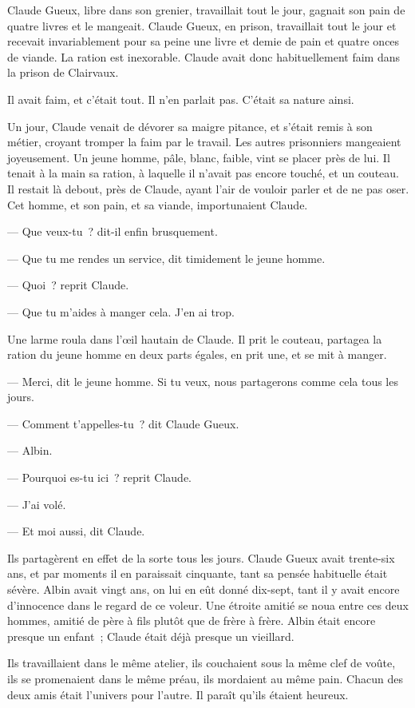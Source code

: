 \documentclass[french,twoside]{book} %
\begin{document}
Claude Gueux, libre dans son grenier, travaillait tout le jour, gagnait son pain de quatre livres et le mangeait. Claude Gueux, en prison, travaillait tout le jour et recevait invariablement pour sa peine une livre et demie de pain et quatre onces de viande. La ration est inexorable. Claude avait donc habituellement faim dans la prison de Clairvaux.\par
Il avait faim, et c’était tout. Il n’en parlait pas. C’était sa nature ainsi.\par
Un jour, Claude venait de dévorer sa maigre pitance, et s’était remis à son métier, croyant tromper la faim par le travail. Les autres prisonniers mangeaient joyeusement. Un jeune homme, pâle, blanc, faible, vint se placer près de lui. Il tenait à la main sa ration, à laquelle il n’avait pas encore touché, et un couteau. Il restait là debout, près de Claude, ayant l’air de vouloir parler et de ne pas oser. Cet homme, et son pain, et sa viande, importunaient Claude.\par
— Que veux-tu ? dit-il enfin brusquement.\par
— Que tu me rendes un service, dit timidement le jeune homme.\par
— Quoi ? reprit Claude.\par
— Que tu m’aides à manger cela. J’en ai trop.\par
Une larme roula dans l’œil hautain de Claude. Il prit le couteau, partagea la ration du jeune homme en deux parts égales, en prit une, et se mit à manger.\par
 — Merci, dit le jeune homme. Si tu veux, nous partagerons comme cela tous les jours.\par
— Comment t’appelles-tu ? dit Claude Gueux.\par
— Albin.\par
— Pourquoi es-tu ici ? reprit Claude.\par
— J’ai volé.\par
— Et moi aussi, dit Claude.\par
Ils partagèrent en effet de la sorte tous les jours. Claude Gueux avait trente-six ans, et par moments il en paraissait cinquante, tant sa pensée habituelle était sévère. Albin avait vingt ans, on lui en eût donné dix-sept, tant il y avait encore d’innocence dans le regard de ce voleur. Une étroite amitié se noua entre ces deux hommes, amitié de père à fils plutôt que de frère à frère. Albin était encore presque un enfant ; Claude était déjà presque un vieillard.\par
Ils travaillaient dans le même atelier, ils couchaient sous la même clef de voûte, ils se promenaient dans le même préau, ils mordaient au même pain. Chacun des deux amis était l’univers pour l’autre. Il paraît qu’ils étaient heureux.\par
\end{document}
